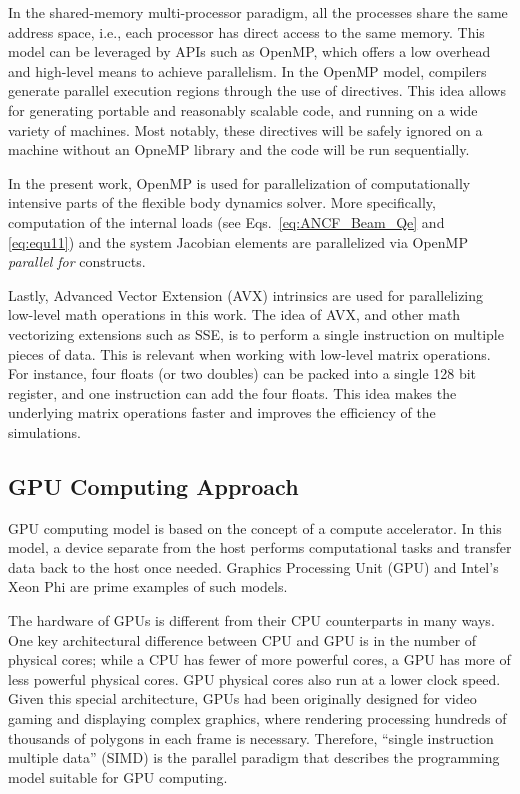 
In the shared-memory multi-processor paradigm, all the processes share the same address space, i.e., each processor has direct access to the same memory.  This model can be leveraged by  APIs such as OpenMP, which offers a low overhead and high-level means to achieve parallelism. In the OpenMP model, compilers generate parallel execution regions through the use of directives. This idea allows for generating portable and reasonably scalable code, and running on a wide variety of machines. Most notably, these directives will be safely ignored on a machine without an OpneMP library and the code will be run sequentially.

In the present work, OpenMP is used for parallelization of computationally intensive parts of the flexible body dynamics solver. More specifically, computation of the internal loads (see Eqs.~\ref{eq:ANCF_Beam_Qe} and \ref{eq:equ11}) and the system Jacobian elements  are parallelized via OpenMP \textit{parallel for} constructs.

Lastly, Advanced Vector Extension (AVX) intrinsics are used for parallelizing low-level math operations in this work. The idea of AVX, and other math vectorizing extensions such as SSE, is to perform a single instruction on multiple pieces of data. This is relevant when working with low-level matrix operations. For instance, four floats (or two doubles) can be packed into a single 128 bit register, and one instruction can add the four floats. This idea makes the underlying matrix operations faster and improves the efficiency of the simulations. 

\subsection{GPU Computing Approach}
GPU computing model is based on the concept of a compute accelerator. In this model, a device separate from the host performs computational tasks and transfer data back to the host once needed. Graphics Processing Unit (GPU) and Intel's Xeon Phi are prime examples of such models. 

The hardware of GPUs is different from their CPU counterparts in many ways. One key architectural difference between CPU and GPU is in the number of physical cores; while a CPU has fewer of more powerful cores, a GPU has more of less powerful physical cores. GPU physical cores also run at a lower clock speed. Given this special architecture, GPUs had been originally designed for video gaming and displaying complex graphics, where rendering processing hundreds of thousands of polygons in each frame is necessary. Therefore, ``single instruction multiple data'' (SIMD) is the parallel paradigm that describes the programming model suitable for GPU computing.

